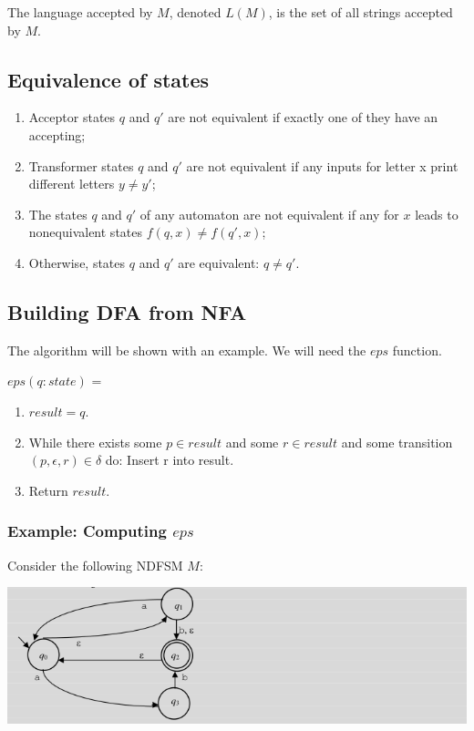 \documentclass[hidelinks,12pt]{article}
\begin{document}
The language accepted by $M$, denoted $L(M)$, is the set of all strings accepted by
$M$.

\subsection{Equivalence of states}

\begin{enumerate}
		\item Acceptor states $q$ and $q'$ are not equivalent if exactly one of
		they have an accepting;

		\item Transformer states $q$ and $q'$ are not equivalent if any inputs
		for letter x print different letters $y \ne y'$;

		\item The states $q$ and $q'$ of any automaton are not equivalent if any
		for $x$ leads to nonequivalent states $f(q,x) \ne f(q',x)$;

		\item Otherwise, states $q$ and $q'$ are equivalent: $q \ne q'$.
\end{enumerate}

\subsection{Building DFA from NFA}

The algorithm will be shown with an example. We will need the $eps$ function.

$eps(q: state)$ =
\begin{enumerate}
		\item $result = {q}$.
		\item While there exists some $p \in result$ and some $r \in result$ and some transition $(p, \epsilon, r) \in \delta$ do:
		Insert r into result.
		\item Return $result$.
\end{enumerate}

\subsubsection{Example: Computing $eps$}

Consider the following NDFSM $M$:

\includegraphics[width=\linewidth]{./img/eps.png}
\end{document}
